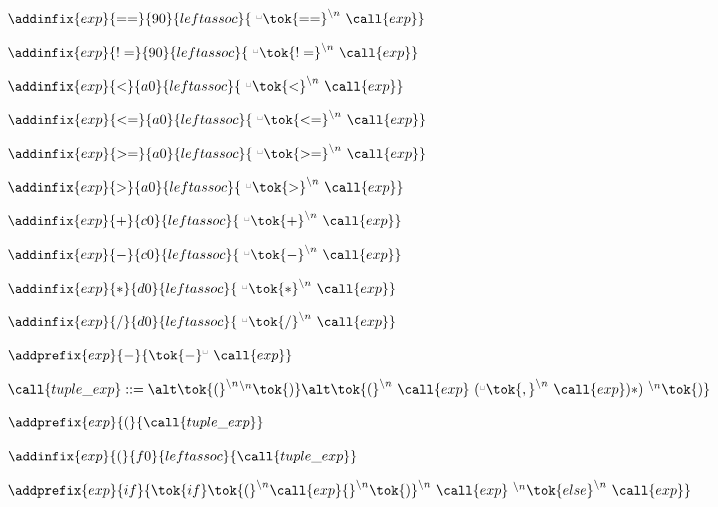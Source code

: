   \item $\addinfix{exp}{==}{90}{leftassoc}{
  \ {{}^{\textrm{\textvisiblespace}}}\tok{==}^{\backslash{}n}\  \call{exp}}$
  \item $\addinfix{exp}{!=}{90}{leftassoc}{
  \ {{}^{\textrm{\textvisiblespace}}}\tok{!=}^{\backslash{}n}\  \call{exp}}$
  \item $\addinfix{exp}{<}{a0}{leftassoc}{
  \ {{}^{\textrm{\textvisiblespace}}}\tok{<}^{\backslash{}n}\  \call{exp}}$
  \item $\addinfix{exp}{<=}{a0}{leftassoc}{
  \ {{}^{\textrm{\textvisiblespace}}}\tok{<=}^{\backslash{}n}\  \call{exp}}$
  \item $\addinfix{exp}{>=}{a0}{leftassoc}{
  \ {{}^{\textrm{\textvisiblespace}}}\tok{>=}^{\backslash{}n}\  \call{exp}}$
  \item $\addinfix{exp}{>}{a0}{leftassoc}{
  \ {{}^{\textrm{\textvisiblespace}}}\tok{>}^{\backslash{}n}\  \call{exp}}$
  \item $\addinfix{exp}{+}{c0}{leftassoc}{
  \ {{}^{\textrm{\textvisiblespace}}}\tok{+}^{\backslash{}n}\  \call{exp}}$
  \item $\addinfix{exp}{-}{c0}{leftassoc}{
  \ {{}^{\textrm{\textvisiblespace}}}\tok{-}^{\backslash{}n}\  \call{exp}}$
  \item $\addinfix{exp}{*}{d0}{leftassoc}{
  \ {{}^{\textrm{\textvisiblespace}}}\tok{*}^{\backslash{}n}\  \call{exp}}$
  \item $\addinfix{exp}{/}{d0}{leftassoc}{
  \ {{}^{\textrm{\textvisiblespace}}}\tok{/}^{\backslash{}n}\  \call{exp}}$
   
 
   \item $\addprefix{exp}{-}{\tok{-}^{\textrm{\textvisiblespace}}\ \call{exp}}$
    
 
   \item $\call{tuple\_exp} ::=\\
   \alt \tok{(}^{\backslash{}n}{}^{\backslash{}n}\tok{)}\\
   \alt \tok{(}^{\backslash{}n}\ \call{exp}\ ({}^{\textrm{\textvisiblespace}}\tok{,}^{\backslash{}n}\ \call{exp})* )\ {}^{\backslash{}n}\tok{)}$
   \item $\addprefix{exp}{(}{\call{tuple\_exp}}$
   \item $\addinfix{exp}{(}{f0}{leftassoc}{\call{tuple\_exp}}$
   
 
   \item $\addprefix{exp}{if}{\tok{if} \tok{(}^{\backslash{}n} \call{exp} {}^{\backslash{}n}\tok{)}^{\backslash{}n}
   \ \call{exp}\ {}^{\backslash{}n}\tok{else}^{\backslash{}n}\ \call{exp}}$
   
